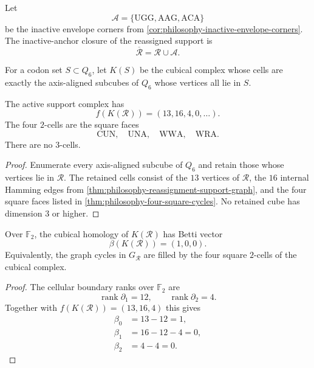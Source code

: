 \begin{definition}
\label{def:philosophy-inactive-anchor-closure}
Let
$$
  \mathcal{A}=\{\mathrm{UGG},\mathrm{AAG},\mathrm{ACA}\}
$$
be the inactive envelope corners from
\autoref{cor:philosophy-inactive-envelope-corners}. The inactive-anchor
closure of the reassigned support is
$$
  \overline{\mathcal{R}}=\mathcal{R}\cup\mathcal{A}.
$$
\end{definition}

\begin{definition}
\label{def:philosophy-cubical-support-complex}
For a codon set $S\subset Q_{6}$, let $K(S)$ be the cubical complex
whose cells are exactly the axis-aligned subcubes of $Q_{6}$ whose
vertices all lie in $S$.
\end{definition}


\begin{theorem}
\label{thm:philosophy-active-cubical-f-vector}
The active support complex has
$$
  f(K(\mathcal{R}))=(13,16,4,0,\ldots).
$$
The four $2$-cells are the square faces
$$
  \mathrm{CUN},\quad \mathrm{UNA},\quad
  \mathrm{WWA},\quad \mathrm{WRA}.
$$
There are no $3$-cells.
\end{theorem}
\begin{proof}
Enumerate every axis-aligned subcube of $Q_{6}$ and retain those whose
vertices lie in $\mathcal{R}$. The retained cells consist of the
$13$ vertices of $\mathcal{R}$, the $16$ internal Hamming edges from
\autoref{thm:philosophy-reassignment-support-graph}, and the four
square faces listed in \autoref{thm:philosophy-four-square-cycles}.
No retained cube has dimension $3$ or higher.
\end{proof}

\begin{theorem}
\label{thm:philosophy-active-cubical-homology}
Over $\mathbb{F}_{2}$, the cubical homology of $K(\mathcal{R})$ has
Betti vector
$$
  \beta(K(\mathcal{R}))=(1,0,0).
$$
Equivalently, the graph cycles in $G_{\mathcal{R}}$ are filled by the
four square $2$-cells of the cubical complex.
\end{theorem}
\begin{proof}
The cellular boundary ranks over $\mathbb{F}_{2}$ are
$$
  \operatorname{rank}\partial_{1}=12,\qquad
  \operatorname{rank}\partial_{2}=4.
$$
Together with $f(K(\mathcal{R}))=(13,16,4)$ this gives
$$
\begin{aligned}
  \beta_{0}&=13-12=1,\\
  \beta_{1}&=16-12-4=0,\\
  \beta_{2}&=4-4=0.
\end{aligned}
$$
\end{proof}

